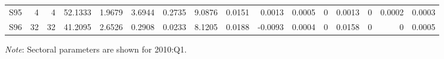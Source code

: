 \begin{table}[!htb]
{\begin{tabular}{rrrrrrrrrrrrrrrr}
S95 & 4 & 4 & 52.1333 & 1.9679 & 3.6944 & 0.2735 & 9.0876 & 0.0151 & 0.0013 & 0.0005 & 0 & 0.0013 & 0 & 0.0002 & 0.0003 \\
S96 & 32 & 32 & 41.2095 & 2.6526 & 0.2908 & 0.0233 & 8.1205 & 0.0188 & -0.0093 & 0.0004 & 0 & 0.0158 & 0 & 0 & 0.0005 \\
\bottomrule
\end{tabular}
}
\begin{tablenotes}
	\footnotesize \item \textit{Note}: Sectoral parameters are shown for 2010:Q1. 
\end{tablenotes}
\end{table}
